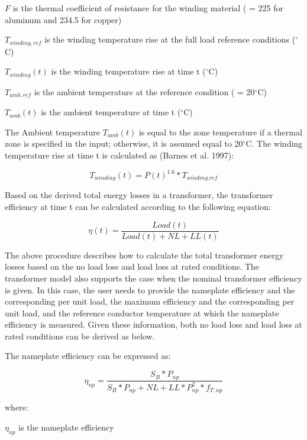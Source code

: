 \(F\) is the thermal coefficient of resistance for the winding material ( = 225 for aluminum and 234.5 for copper)

\({T_{winding,ref}}\) is the winding temperature rise at the full load reference conditions (\(^{\circ}\)C)

\({T_{winding}}(t)\) is the winding temperature rise at time t (\(^{\circ}\)C)

\({T_{amb,ref}}\) is the ambient temperature at the reference condition ( = 20\(^{\circ}\)C)

\({T_{amb}}(t)\) is the ambient temperature at time t (\(^{\circ}\)C)

The Ambient temperature \({T_{amb}}(t)\) is equal to the zone temperature if a thermal zone is specified in the input; otherwise, it is assumed equal to 20\(^{\circ}\)C. The winding temperature rise at time t is calculated as (Barnes et al. 1997):

\begin{equation}
{T_{winding}}(t) = P{(t)^{1.6}}*{T_{winding.ref}}
\end{equation}

Based on the derived total energy losses in a transformer, the transformer efficiency at time t can be calculated according to the following equation:

\begin{equation}
\eta (t) = \frac{{Load(t)}}{{Load(t) + NL + LL(t)}}
\end{equation}

The above procedure describes how to calculate the total transformer energy losses based on the no load loss and load loss at rated conditions. The transformer model also supports the case when the nominal transformer efficiency is given. In this case, the user needs to provide the nameplate efficiency and the corresponding per unit load, the maximum efficiency and the corresponding per unit load, and the reference conductor temperature at which the nameplate efficiency is measured. Given these information, both no load loss and load loss at rated conditions can be derived as below.

The nameplate efficiency can be expressed as:

\begin{equation}
{\eta_{np}} = \frac{{{S_B}*{P_{np}}}}{{{S_B}*{P_{np}} + NL + LL*P_{np}^2*{f_{T,np}}}}
\label{eq:ElecLoadetanp863}
\end{equation}

where:

\({\eta_{np}}\) is the nameplate efficiency

